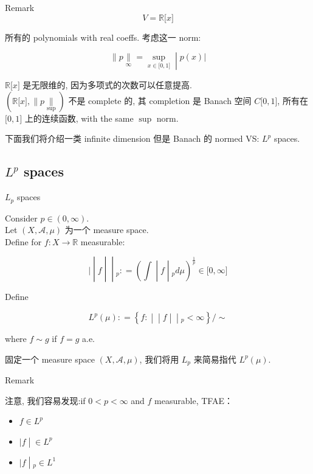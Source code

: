 \documentclass{qlnotes-export}
\begin{document}
\begin{qlremark}{Remark}
\[V = {\mathbb{R}}\lbrack x\rbrack\]

所有的 polynomials with real coeffs. 考虑这一 norm:

\[\left. \parallel p\underset{\infty}{\parallel} = \sup\limits_{x \in \lbrack 0,1\rbrack} \middle| p(x)| \right.\]

\({\mathbb{R}}\lbrack x\rbrack\) 是无限维的, 因为多项式的次数可以任意提高.\\
\(({\mathbb{R}}\lbrack x\rbrack, \parallel p\underset{\sup}{\parallel})\) 不是 complete 的, 其 completion 是 Banach 空间 \(C\lbrack 0,1\rbrack\), 所有在 \(\lbrack 0,1\rbrack\) 上的连续函数, with the same \(\sup\) norm.\\

\end{qlremark}

下面我们将介绍一类 infinite dimension 但是 Banach 的 normed VS: \(L^{p}\) spaces.

\subsection{\texorpdfstring{\(L^{p}\) spaces}{L\^{}\{p\} spaces}}\label{lp-spaces}

\begin{definition}{\(L_{p}\) spaces}\label{def-09-l-p-space-and-inequalities-l-p-spaces}

Consider \(p \in (0,\infty)\).\\
Let \((X,\mathcal{A},\mu)\) 为一个 measure space.\\
Define for \(f:X\rightarrow{\mathbb{R}}\) measurable:

\[\left. | \middle| f \middle| \middle| {}_{p}: = (\int \middle| f \middle| {}_{p} d\mu)^{\frac{1}{p}} \in \lbrack 0,\infty\rbrack \right.\]

Define

\[L^{p}(\mu): = \left\{ f: \middle| \middle| f \middle| \middle| {}_{p} < \infty \right\}/ \sim\]

where \(f \sim g\) if \(f = g\) a.e.

\end{definition}

固定一个 measure space \((X,\mathcal{A},\mu)\), 我们将用 \(L_{p}\) 来简易指代 \(L^{p}(\mu)\).\\

\begin{qlremark}{Remark}

注意, 我们容易发现:if \(0 < p < \infty\) and \(f\) measurable, TFAE：

\begin{itemize}
\item
  \(f \in L^{p}\)
\item
  \(\left. |f \middle| \in L^{p} \right.\)
\item
  \(\left. |f \middle| {}_{p} \in L^{1} \right.\)
\end{itemize}

\end{qlremark}
\end{document}
